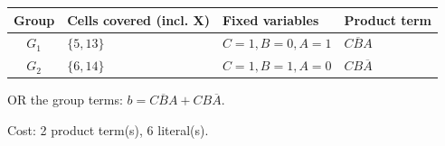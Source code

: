 \documentclass[a4paper,11pt]{article}
\begin{document}
\begin{minipage}{\textwidth}
\begin{center}\small
\begin{tabular}{clll}
\toprule
Group & Cells covered (incl. X) & Fixed variables & Product term\\\midrule
\textcolor{blue!75!black}{$G_{1}$} & $\{5,13\}$ & $C=1,B=0,A=1$ & $C\overline{B}A$\\
\textcolor{red!75!black}{$G_{2}$} & $\{6,14\}$ & $C=1,B=1,A=0$ & $CB\overline{A}$\\
\bottomrule\end{tabular}\end{center}


\noindent OR the group terms: $\boxed{b=C\overline{B}A + CB\overline{A}}$.

\noindent Cost: 2 product term(s), 6 literal(s).

\end{minipage}\par\vspace{0.25cm}

\clearpage
\end{document}
